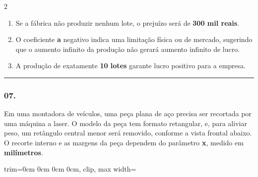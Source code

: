 \documentclass[twoside, 10pt, a4paper]{article}
\newlength{\espacoPreQuestao}
\newlength{\espacoQuestao}
\newlength{\larguraTikz}
\begin{document}
\begin{multicols*}{2}
\begin{enumerate}[label=\Roman*.]
    \item Se a fábrica não produzir nenhum lote, o prejuízo será de \textbf{300 mil reais}.
    \item O coeficiente \textbf{a} negativo indica uma limitação física ou de mercado, sugerindo que o aumento infinito da produção não gerará aumento infinito de lucro.
    \item A produção de exatamente \textbf{10 lotes} garante lucro positivo para a empresa.
\end{enumerate}
\par\vspace{\espacoQuestao}

\noindent\textcolor{CorLinha}{\rule{\linewidth}{0.5pt}} 
\par\vspace{\espacoPreQuestao}
\subsubsection*{07.} Em uma montadora de veículos, uma peça plana de aço precisa ser recortada por uma máquina a laser. O modelo da peça tem formato retangular, e, para aliviar peso, um retângulo central menor será removido, conforme a vista frontal abaixo. O recorte interno e as margens da peça dependem do parâmetro \textbf{x}, medido em \textbf{milímetros}.

\begin{center}
\begin{adjustbox}{trim=0cm 0cm 0cm 0cm, clip, max width=\larguraTikz}
\end{adjustbox}
\end{center}
\end{multicols*}
\end{document}
